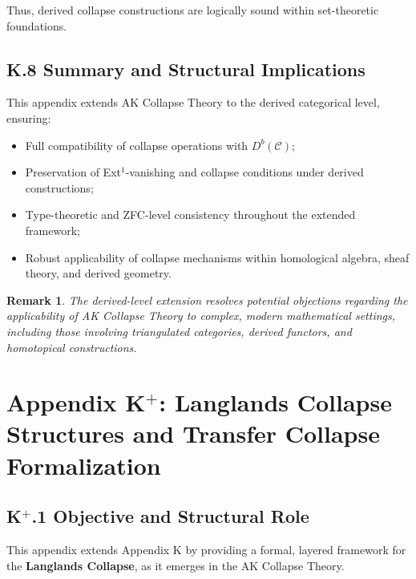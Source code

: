 \documentclass[11pt]{article}
\newtheorem{remark}[theorem]{Remark}
\begin{document}
Thus, derived collapse constructions are logically sound within set-theoretic foundations.

\subsection*{K.8 Summary and Structural Implications}

This appendix extends AK Collapse Theory to the derived categorical level, ensuring:

\begin{itemize}
    \item Full compatibility of collapse operations with \( D^b(\mathcal{C}) \);
    \item Preservation of Ext$^1$-vanishing and collapse conditions under derived constructions;
    \item Type-theoretic and ZFC-level consistency throughout the extended framework;
    \item Robust applicability of collapse mechanisms within homological algebra, sheaf theory, and derived geometry.
\end{itemize}

\begin{remark}
The derived-level extension resolves potential objections regarding the applicability of AK Collapse Theory to complex, modern mathematical settings, including those involving triangulated categories, derived functors, and homotopical constructions.
\end{remark}




\section*{Appendix K$^{+}$: Langlands Collapse Structures and Transfer Collapse Formalization}

\subsection*{K$^{+}$.1 Objective and Structural Role}

This appendix extends Appendix K by providing a formal, layered framework for the \textbf{Langlands Collapse}, as it emerges in the AK Collapse Theory.
\end{document}
